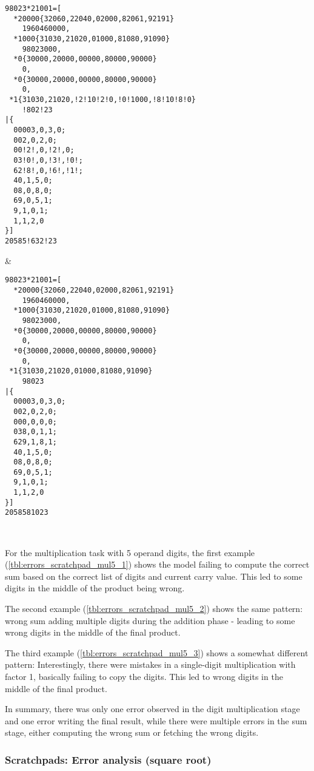 \ErrorAnalysisTableBegin
\begin{lstlisting}
98023*21001=[
  *20000{32060,22040,02000,82061,92191}
    1960460000,
  *1000{31030,21020,01000,81080,91090}
    98023000,
  *0{30000,20000,00000,80000,90000}
    0,
  *0{30000,20000,00000,80000,90000}
    0,
 *1{31030,21020,!2!10!2!0,!0!1000,!8!10!8!0}
    !802!23
|{
  00003,0,3,0;
  002,0,2,0;
  00!2!,0,!2!,0;
  03!0!,0,!3!,!0!;
  62!8!,0,!6!,!1!;
  40,1,5,0;
  08,0,8,0;
  69,0,5,1;
  9,1,0,1;
  1,1,2,0
}]
20585!632!23
\end{lstlisting} &
\begin{lstlisting}
98023*21001=[
  *20000{32060,22040,02000,82061,92191}
    1960460000,
  *1000{31030,21020,01000,81080,91090}
    98023000,
  *0{30000,20000,00000,80000,90000}
    0,
  *0{30000,20000,00000,80000,90000}
    0,
 *1{31030,21020,01000,81080,91090}
    98023
|{
  00003,0,3,0;
  002,0,2,0;
  000,0,0,0;
  038,0,1,1;
  629,1,8,1;
  40,1,5,0;
  08,0,8,0;
  69,0,5,1;
  9,1,0,1;
  1,1,2,0
}]
2058581023
\end{lstlisting}
\\

For the multiplication task with 5 operand digits, the first example (\cref{tbl:errors_scratchpad_mul5_1}) shows the model failing to compute the correct sum based on the correct list of digits and current carry value. This led to some digits in the middle of the product being wrong.

The second example  (\cref{tbl:errors_scratchpad_mul5_2}) shows the same pattern: wrong sum adding multiple digits during the addition phase - leading to some wrong digits in the middle of the final product.

The third example  (\cref{tbl:errors_scratchpad_mul5_3}) shows a somewhat different pattern: Interestingly, there were mistakes in a single-digit multiplication with factor 1, basically failing to copy the digits. This led to wrong digits in the middle of the final product.

In summary, there was only one error observed in the digit multiplication stage and one error writing the final result, while there were multiple errors in the sum stage, either computing the wrong sum or fetching the wrong digits.


\subsubsection{Scratchpads: Error analysis (square root)}



